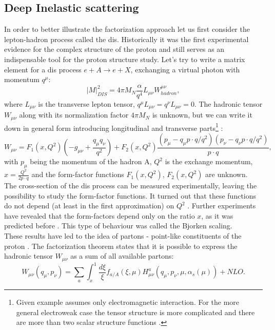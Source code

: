		\subsection{Deep Inelastic scattering}
		In order to better illustrate the factorization approach let us first consider the lepton-hadron process called the \gls{dis}. Historically it was the first experimental evidence for the complex structure of the proton and still serves as an indispensable tool for the proton structure study. Let's try to write a matrix element for a \gls{dis} process $e+A\rightarrow e+X$, exchanging a virtual photon with momentum $q^{\mu}$:
		 \begin{equation}
		|M|^2_{DIS}=4\pi M_N\frac{\alpha}{q^4}L_{\mu \nu}W^{\mu \nu}_{hadron},
		\end{equation}
		where $L_{\mu \nu}$ is the transverse lepton tensor, $q^{\mu}L_{\mu \nu}=q^{\nu}L_{\mu \nu}=0$. The hadronic tensor $W_{\mu \nu}$ along with its normalization factor $4\pi M_N$ is unknown, but we can write it down in general form introducing longitudinal and transverse parts\footnote{Given example assumes only electromagnetic interaction. For the more general electroweak case the tensor structure is more complicated and there are more than two scalar structure functions \cite{proton_struct}.} \cite{factorization}:
		\begin{equation}
		W_{\mu \nu}=F_1(x,Q^2)\left(-g_{\mu \nu}+\frac{q_{\mu}q_{\nu}}{q^2}\right)+F_2(x,Q^2)\frac{\left(p_{\mu}-q_{\mu}p\cdot q / q^2\right)\left(p_{\nu}-q_{\nu}p\cdot q / q^2\right)}{p\cdot q},
		\end{equation}
		with $p_{\mu}$ being the momentum of the hadron A, $Q^2$ is the exchange momentum, $x=\frac{Q^2}{2p \cdot q }$ and the form-factor functions $F_1(x,Q^2)$, $F_2(x,Q^2)$ are unknown. \\
		The cross-section of the \gls{dis} process can be measured experimentally, leaving the possibility to study the form-factor functions. It turned out that these functions do not depend (at least in the first approximation) on $Q^2$ \cite{dis1}. Further experiments have revealed that the form-factors depend only on the ratio $x$, as it was predicted before \cite{bjorken}. This type of behaviour was called the Bjorken scaling.\\
		These results have led to the idea of partons - point-like constituents of the proton \cite{feynman_partons}. The factorization theorem states that it is possible to express the hadronic tensor $W_{\mu \nu}$ as a sum of all available partons:
			\begin{equation}
		W_{\mu \nu}(q_{\mu},p_{\nu})=\sum_{a} \int_{x}^{1}\frac{d\xi}{\xi} f_{a/A}(\xi,\mu) H^a_{\mu\nu}(q_{\mu},p_{\nu},\mu,\alpha_s(\mu)) + NLO.
		\end{equation}
